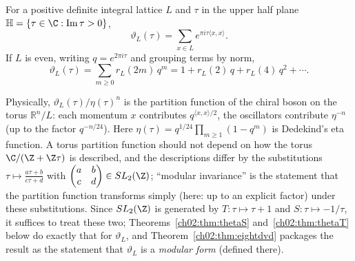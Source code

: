 \begin{definition}\label{ch02:def:theta}
For a positive definite integral lattice $L$ and $\tau$ in the upper half plane
$\mathbb{H}=\{\tau\in\C:\operatorname{Im}\tau>0\}$,
\begin{equation*}
\vartheta_L(\tau)=\sum_{x\in L}e^{\pi i\tau\langle x,x\rangle}.
\end{equation*}
If $L$ is even, writing $q=e^{2\pi i\tau}$ and grouping terms by norm,
\begin{equation}\label{ch02:eq:qexp}
\vartheta_L(\tau)=\sum_{m\ge0}r_L(2m)\,q^m=1+r_L(2)\,q+r_L(4)\,q^2+\cdots .
\end{equation}
\end{definition}
Physically, $\vartheta_L(\tau)/\eta(\tau)^n$ is the partition function of the chiral boson on the
torus $\mathbb{R}^n/L$: each momentum $x$ contributes $q^{\langle x,x\rangle/2}$, the oscillators
contribute $\eta^{-n}$ (up to the factor $q^{-n/24}$).  Here
$\eta(\tau)=q^{1/24}\prod_{m\ge1}(1-q^m)$ is Dedekind's eta function.  A torus partition function
should not depend on how the torus $\C/(\Z+\Z\tau)$ is described, and the descriptions differ by
the substitutions $\tau\mapsto\frac{a\tau+b}{c\tau+d}$ with $\begin{pmatrix}a&b\\c&d\end{pmatrix}\in
SL_2(\Z)$; ``modular invariance'' is the statement that the partition function transforms
simply (here: up to an explicit factor) under these substitutions.  Since $SL_2(\Z)$ is generated
by $T:\tau\mapsto\tau+1$ and $S:\tau\mapsto-1/\tau$, it suffices to treat these two;
Theorems~\ref{ch02:thm:thetaS} and~\ref{ch02:thm:thetaT} below do exactly that for
$\vartheta_L$, and Theorem~\ref{ch02:thm:eightdvd} packages the result as the statement that
$\vartheta_L$ is a \emph{modular form} (defined there).

